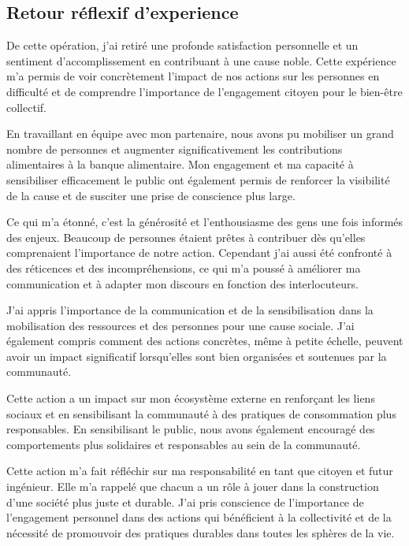 \documentclass[11pt, openright]{book}
\begin{document}
        \subsection*{Retour réflexif d'experience}

        De cette opération, j'ai retiré une profonde satisfaction personnelle et un sentiment d'accomplissement en contribuant à une cause noble. 
    Cette expérience m'a permis de voir concrètement l'impact de nos actions sur les personnes en difficulté et de comprendre l'importance de l'engagement citoyen pour le bien-être collectif.

    En travaillant en équipe avec mon partenaire, nous avons pu mobiliser un grand nombre de personnes et augmenter significativement les contributions alimentaires à la banque alimentaire. Mon engagement et ma capacité à sensibiliser efficacement le public ont également permis de renforcer la visibilité de la cause et de susciter une prise de conscience plus large.

    Ce qui m'a étonné, c'est la générosité et l'enthousiasme des gens une fois informés des enjeux. Beaucoup de personnes étaient prêtes à contribuer dès qu'elles comprenaient l'importance de notre action. Cependant j'ai aussi été confronté à des réticences et des incompréhensions, ce qui m'a poussé à améliorer ma communication et à adapter mon discours en fonction des interlocuteurs.

    J'ai appris l'importance de la communication et de la sensibilisation dans la mobilisation des ressources et des personnes pour une cause sociale. J'ai également compris comment des actions concrètes, même à petite échelle, peuvent avoir un impact significatif lorsqu'elles sont bien organisées et soutenues par la communauté.

    Cette action a un impact sur mon écosystème externe en renforçant les liens sociaux et en sensibilisant la communauté à des pratiques de consommation plus responsables. En sensibilisant le public, nous avons également encouragé des comportements plus solidaires et responsables au sein de la communauté.


Cette action m'a fait réfléchir sur ma responsabilité en tant que citoyen et futur ingénieur. Elle m'a rappelé que chacun a un rôle à jouer dans la construction d'une société plus juste et durable. J'ai pris conscience de l'importance de l'engagement personnel dans des actions qui bénéficient à la collectivité et de la nécessité de promouvoir des pratiques durables dans toutes les sphères de la vie.
\end{document}
